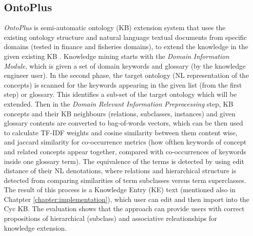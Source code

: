 \subsection{OntoPlus}
\label{section:r:ontoplus}
\emph{OntoPlus} is semi-automatic ontology (KB) extension system that uses the 
existing ontology structure and natural language textual documents from specific
domains (tested in finance and fisheries domains), to extend the knowledge in 
the given existing KB \parencite{Novalija2011}. Knowledge mining starts with
the \emph{Domain Information Module}, which is given a set of domain keywords
and glossary (by the knowledge engineer user). In the second phase, the target
ontology (NL representation of the concepts) is scanned for the keywords
appearing in the given list (from the first step) or glossary. This identifies
a sub-set of the target ontology which will be extended.
Then in the \emph{Domain Relevant Information Preprocessing} step, KB concepts
and their KB neighbours (relations, subclasses, instances) and given glossary 
contents are converted to bag-of-words vectors, which can be then used to
calculate TF-IDF weights and cosine similarity between them content wise, and
jaccard similarity for co-occurrence metrics (how ofthen keywords of concept and
related concepts appear together, compared with co-occurrences of keywords
inside one glossary term). The equivalence of the terms is detected by
using edit distance of their NL denotations, where relations and hierarchical
structure is detected from comparing similarities of term subclasses versus
term superclasses. The result of this process is a Knowledge Entry (KE) text
(mentioned also in Chatpter \ref{chapter:implementation}), which user can edit and 
then import into the Cyc KB. The evaluation shows that the approach can provide
users with correct propositions of hierarchical (subclass) and associative
releationships for knowledge extension.

